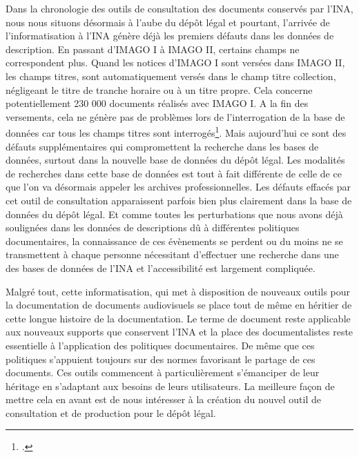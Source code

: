 

Dans la chronologie des outils de consultation des documents conservés par l’INA, nous nous situons désormais à l’aube du dépôt légal et pourtant, l’arrivée de l’informatisation à l’INA génère déjà les premiers défauts dans les données de description. En passant d’IMAGO I à IMAGO II, certains champs ne correspondent plus. Quand les notices d’IMAGO I sont versées dans IMAGO II, les champs titres, sont automatiquement versés dans le champ titre collection, négligeant le titre de tranche horaire ou à un titre propre. Cela concerne potentiellement 230 000 documents réalisés avec IMAGO I. A la fin des versements, cela ne génère pas de problèmes lors de l’interrogation de la base de données car tous les champs titres sont interrogés\footcite[][53]{bassaïstéguy2025}. Mais aujourd’hui ce sont des défauts supplémentaires qui compromettent la recherche dans les bases de données, surtout dans la nouvelle base de données du dépôt légal. Les modalités de recherches dans cette base de données est tout à fait différente de celle de ce que l’on va désormais appeler les archives professionnelles. Les défauts effacés par cet outil de consultation apparaissent parfois bien plus clairement dans la base de données du dépôt légal. Et comme toutes les perturbations que nous avons déjà soulignées dans les données de descriptions dû à différentes politiques documentaires, la connaissance de ces évènements se perdent ou du moins ne se transmettent à chaque personne nécessitant d’effectuer une recherche dans une des bases de données de l’INA et l’accessibilité est largement compliquée.


Malgré tout, cette informatisation, qui met à disposition de nouveaux outils pour la documentation de documents audiovisuels se place tout de même en héritier de cette longue histoire de la documentation. Le terme de document reste applicable aux nouveaux supports que conservent l'INA et la place des documentalistes reste essentielle à l'application des politiques documentaires. De même que ces politiques s'appuient toujours sur des normes favorisant le partage de ces documents. Ces outils commencent à particulièrement s'émanciper de leur héritage en s'adaptant aux besoins de leurs utilisateurs. La meilleure façon de mettre cela en avant est de nous intéresser à la création du nouvel outil de consultation et de production pour le dépôt légal. 